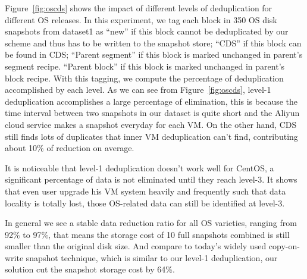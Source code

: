 
Figure~\ref{fig:oscds} shows the impact of different levels of deduplication for different OS releases.
In this experiment, we tag each block in 350 OS disk snapshots from dataset1 as  ``new''
if this block cannot be deduplicated by our scheme and thus has to be written to the snapshot store;
``CDS''  if this block can be found  in CDS;
``Parent segment'' if  this block is marked unchanged in parent's segment recipe.
``Parent block'' if  this block is marked unchanged in parent's block recipe.
With this tagging, we compute the percentage of deduplication accomplished by each level.
As we can see from Figure~\ref{fig:oscds}, level-1 deduplication accomplishes a large percentage of elimination,
this is because the time interval between two snapshots in our dataset
is quite short and the Aliyun cloud service makes a snapshot  everyday  for each VM.
On the other hand,  CDS still finds lots of duplicates that inner VM deduplication can't find,
contributing about 10\% of reduction on average.

It is noticeable that level-1 deduplication doesn't work well for CentOS, a significant percentage of data is not
eliminated until they reach level-3. It shows that even user upgrade his VM system heavily and frequently
such that data locality is totally lost, those OS-related data can still be identified at level-3. 

In general we see a stable data reduction ratio for all OS varieties, ranging from 92\% to 97\%, that means
the storage cost of 10 full snapshots combined is still smaller than the original disk size. And compare to 
today's widely used copy-on-write snapshot technique, which is similar to our level-1 deduplication, our
solution cut the snapshot storage cost by 64\%.



